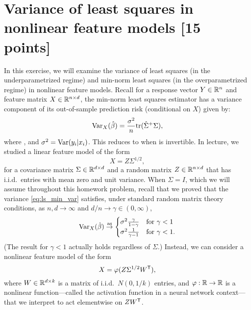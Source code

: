 \documentclass{article}
\begin{document}
\section{Variance of least squares in nonlinear feature models [15 points]} 

\def\asto{\overset{\mathrm{as}}{\to}}
\def\hSigma{\hat\Sigma}

In this exercise, we will examine the variance of least squares (in the
underparametrized regime) and min-norm least squares (in the overparametrized 
regime) in nonlinear feature models. Recall for a response vector $Y \in \mathbb{R}^n$
and feature matrix $X \in \mathbb{R}^{n \times d}$, the min-norm least squares estimator 
 has a variance component of its
out-of-sample prediction risk (conditional on $X$) given by:
\begin{equation}
\label{eq:ls_min_var}
\Var_X(\hbeta) = \frac{\sigma^2}{n} \tr (\hSigma^+ \Sigma),
\end{equation}
where \smash{$\hSigma = X^\T X/n$}, and $\sigma^2 = \mathrm{Var}(y_i | x_i)$. This
reduces to \smash{$\Var_X(\hbeta) = \frac{\sigma^2}{n} \tr (\hSigma^{-1}
  \Sigma)$} when \smash{$\hSigma$} is invertible. In lecture, we studied a
linear feature model of the form  
\begin{equation}
\label{eq:linear_features}
X = Z \Sigma^{1/2},
\end{equation}
for a covariance matrix $\Sigma \in \mathbb{R}^{d \times d}$ and a random matrix $Z \in
\mathbb{R}^{n \times d}$ that has i.i.d.\ entries with mean zero and unit variance. When
$\Sigma = I$, which we will assume throughout this homework problem, recall that
we proved that the variance \eqref{eq:ls_min_var} satisfies, under standard
random matrix theory conditions, as $n,d \to \infty$ and $d/n \to \gamma \in 
(0,\infty)$, 
\begin{equation}
\label{eq:ls_min_var_iso_limit}
\Var_X(\hbeta) \asto 
\begin{cases}
\sigma^2 \frac{\gamma}{1-\gamma} & \text{for $\gamma < 1$} \\ 
\sigma^2 \frac{1}{\gamma-1} & \text{for $\gamma < 1$}.
\end{cases}
\end{equation}
(The result for $\gamma < 1$ actually holds regardless of $\Sigma$.) Instead, we
can consider a nonlinear feature model of the form 
\begin{equation}
\label{eq:nonlinear_features}
X = \varphi(Z \Sigma^{1/2} W^{\mathsf{T}}),
\end{equation}
where $W \in \mathbb{R}^{d \times k}$ is a matrix of i.i.d.\ $N(0,1/k)$ entries, and
$\varphi : \mathbb{R} \to \mathbb{R}$ is a nonlinear function---called the activation function
in a neural network context---that we interpret to act elementwise on $Z
W^{\mathsf{T}}$. 
\end{document}
